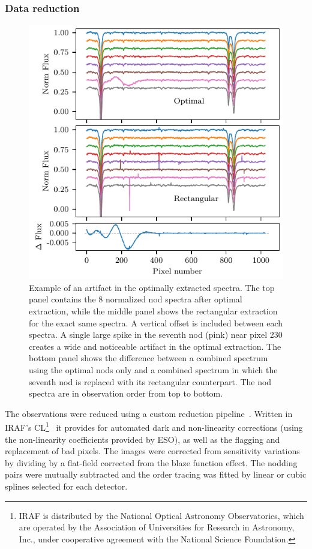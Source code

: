 \documentclass[fleqn,usenatbib]{mnras}
\newcommand*\rd{\color{red}}
\begin{document}
\subsubsection{Data reduction}
\label{subsubsec:reduction}
\begin{figure}
    \includegraphics[width=\hsize]{images/Bad_pixel_replacement.pdf} %
    \caption{Example of an artifact in the optimally extracted spectra. The top panel contains the 8 normalized nod spectra after optimal extraction, while the middle panel shows the rectangular extraction for the exact same spectra. A vertical offset is included between each spectra. A single large spike in the seventh nod (pink) near pixel 230 creates a wide and noticeable artifact in the optimal extraction. The bottom panel shows the difference between a combined spectrum using the optimal nods only and a combined spectrum in which the seventh nod is replaced with its rectangular counterpart. The nod spectra are in observation order from top to bottom.}
    \label{fig:nod_artifacts}
\end{figure}

The observations were reduced using a custom reduction pipeline~\citep{figueira_radial_2010}. Written in IRAF's CL\footnote{IRAF is distributed by the National Optical Astronomy Observatories, which are operated by the Association of Universities for Research in Astronomy, {Inc.}, under cooperative agreement with the National Science Foundation.}~\citep{tody_iraf_1993} it provides for automated dark and non-linearity corrections (using the non-linearity coefficients provided by ESO), as well as the flagging and replacement of bad pixels. The images were corrected from sensitivity variations by dividing by a flat-field corrected from the blaze function effect. The nodding pairs were mutually subtracted and the order tracing was fitted by {\rd linear or cubic splines selected for each detector}.
\end{document}
